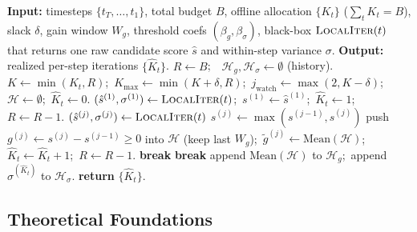 \begin{algorithm}[t]
\caption{\textsc{GAINS}: Global Adaptive Inference-time Noise Scheduling}
\label{alg:gains}
\begin{algorithmic}[1]
\STATE \textbf{Input:} timesteps $\{t_T,\dots,t_1\}$, total budget $B$, offline allocation $\{K_t\}$ ($\sum_t K_t = B$), slack $\delta$, gain window $W_g$, threshold coefs $(\beta_g,\beta_\sigma)$, black-box $\textsc{LocalIter}(t)$ that returns one raw candidate score $\hat s$ and within-step variance $\sigma$.
\STATE \textbf{Output:} realized per-step iterations $\{\widehat K_t\}$.
\STATE $R \leftarrow B$;\ \ $\mathcal{H}_g, \mathcal{H}_\sigma\leftarrow\emptyset$ (history).
    \STATE $K \leftarrow \min(K_t, R)$;\ $K_{\max}\leftarrow \min(K+\delta, R)$;\ $j_{\text{watch}}\leftarrow \max(2, K-\delta)$;\ $\mathcal{H}\leftarrow\emptyset$;\ $\widehat K_t \leftarrow 0$.
    \STATE $(\hat s^{(1)}, \sigma^{(1)}) \leftarrow \textsc{LocalIter}(t)$;\ $s^{(1)} \leftarrow \hat s^{(1)}$;\ $\widehat K_t \leftarrow 1$;\ $R \leftarrow R-1$.
        \STATE $(\hat s^{(j)}, \sigma^{(j)}) \leftarrow \textsc{LocalIter}(t)$
        \STATE $s^{(j)} \leftarrow \max(s^{(j-1)}, \hat s^{(j)})$ \hfill {\small{}}
        \STATE push $g^{(j)}\!\leftarrow\!s^{(j)}\!-\!s^{(j-1)} \ge 0$ into $\mathcal{H}$ (keep last $W_g$);\ $\widetilde g^{(j)}\!\leftarrow\!\mathrm{Mean}(\mathcal{H})$;\ $\widehat K_t\!\leftarrow\!\widehat K_t+1$;\ $R \leftarrow R-1$.
         \STATE \textbf{break} \ENDIF
            \STATE \textbf{break}
        \ENDIF
    \ENDFOR
    \STATE append $\mathrm{Mean}(\mathcal{H})$ to $\mathcal{H}_g$;\ append $\sigma^{(\widehat K_t)}$ to $\mathcal{H}_\sigma$.
\ENDFOR
\STATE \textbf{return} $\{\widehat K_t\}$.
\end{algorithmic}
\end{algorithm}

\subsection{Theoretical Foundations}
\label{sec:theory}

